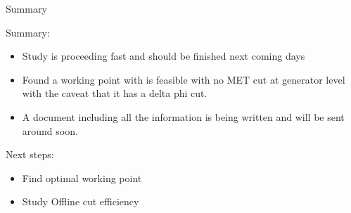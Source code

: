 \documentclass[8pt]{beamer}
\begin{document}
\begin{frame}{Summary}
 
\begin{block}{Summary:}
 
\begin{itemize}
  \item Study is proceeding fast and should be finished next coming days
  \item Found a working point with is feasible with no MET cut at generator level with the caveat that it has a delta phi cut.
  \item A document including all the information is being written and will be sent around soon.
\end{itemize}

\end{block}

\begin{block}{Next steps:}
 
\begin{itemize}
  \item Find optimal working point
  \item Study Offline cut efficiency
\end{itemize}

\end{block}

\end{frame}
\end{document}
